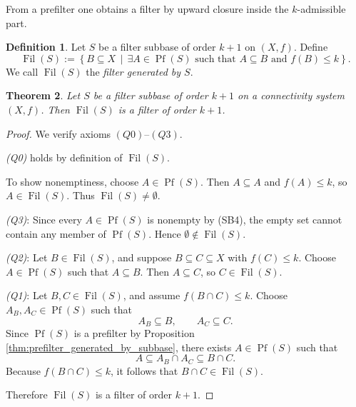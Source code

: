 \documentclass[10pt]{book}
\newtheorem{theorem}{Theorem}[section]
\theoremstyle{definition}
\newtheorem{definition}[theorem]{Definition}
\begin{document}
From a prefilter one obtains a filter by upward closure inside the \(k\)-admissible part.

\begin{definition}
\label{def:filter_generated_by_subbase}
Let \(S\) be a filter subbase of order \(k+1\) on \((X,f)\).
Define
\[
\operatorname{Fil}(S)
:=
\left\{
B\subseteq X \,\middle|\,
\exists A\in \operatorname{Pf}(S)\text{ such that }A\subseteq B
\text{ and } f(B)\leq k
\right\}.
\]
We call \(\operatorname{Fil}(S)\) the \emph{filter generated by \(S\)}.
\end{definition}

\begin{theorem}
\label{thm:filter_generated_by_subbase}
Let \(S\) be a filter subbase of order \(k+1\) on a connectivity system \((X,f)\).
Then \(\operatorname{Fil}(S)\) is a filter of order \(k+1\).
\end{theorem}

\begin{proof}
We verify axioms \((Q0)\)--\((Q3)\).

\emph{(Q0)} holds by definition of \(\operatorname{Fil}(S)\).

To show nonemptiness, choose \(A\in \operatorname{Pf}(S)\).
Then \(A\subseteq A\) and \(f(A)\leq k\), so \(A\in \operatorname{Fil}(S)\).
Thus \(\operatorname{Fil}(S)\neq \emptyset\).

\emph{(Q3)}:
Since every \(A\in \operatorname{Pf}(S)\) is nonempty by (SB4), the empty set cannot contain any member of \(\operatorname{Pf}(S)\).
Hence \(\emptyset\notin \operatorname{Fil}(S)\).

\emph{(Q2)}:
Let \(B\in \operatorname{Fil}(S)\), and suppose \(B\subseteq C\subseteq X\) with \(f(C)\leq k\).
Choose \(A\in \operatorname{Pf}(S)\) such that \(A\subseteq B\).
Then \(A\subseteq C\), so \(C\in \operatorname{Fil}(S)\).

\emph{(Q1)}:
Let \(B,C\in \operatorname{Fil}(S)\), and assume \(f(B\cap C)\leq k\).
Choose \(A_B,A_C\in \operatorname{Pf}(S)\) such that
\[
A_B\subseteq B,\qquad A_C\subseteq C.
\]
Since \(\operatorname{Pf}(S)\) is a prefilter by Proposition \ref{thm:prefilter_generated_by_subbase},
there exists \(A\in \operatorname{Pf}(S)\) such that
\[
A\subseteq A_B\cap A_C \subseteq B\cap C.
\]
Because \(f(B\cap C)\leq k\), it follows that \(B\cap C\in \operatorname{Fil}(S)\).

Therefore \(\operatorname{Fil}(S)\) is a filter of order \(k+1\).
\end{proof}
\end{document}
